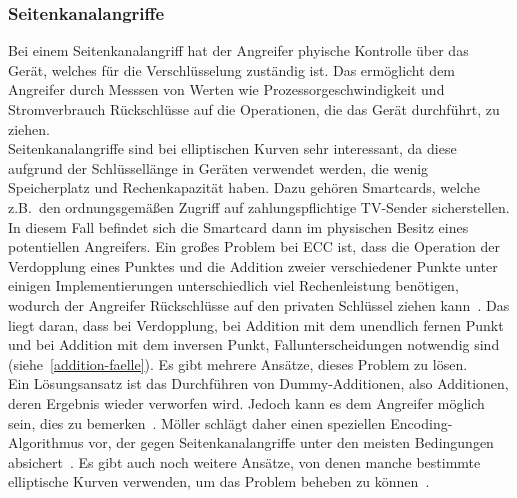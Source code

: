 \documentclass[hidelinks]{article}
\theoremstyle{plain}
\theoremstyle{definition}
\theoremstyle{rem}
\begin{document}
\begin{sloppypar}
\subsubsection{Seitenkanalangriffe}
Bei einem Seitenkanalangriff hat der Angreifer phyische Kontrolle über das Gerät, welches für die Verschlüsselung zuständig ist.
Das ermöglicht dem Angreifer durch Messsen von Werten wie Prozessorgeschwindigkeit und Stromverbrauch Rückschlüsse auf die Operationen, die das Gerät durchführt, zu ziehen.\\
Seitenkanalangriffe sind bei elliptischen Kurven sehr interessant, da diese aufgrund der Schlüssellänge in Geräten verwendet werden, die wenig Speicherplatz und Rechenkapazität haben. Dazu gehören Smartcards, welche z.B.\ den ordnungsgemäßen Zugriff auf zahlungspflichtige TV-Sender sicherstellen. In diesem Fall befindet sich die Smartcard dann im physischen Besitz eines potentiellen Angreifers.
Ein großes Problem bei ECC ist, dass die Operation der Verdopplung eines Punktes und die Addition zweier verschiedener Punkte unter einigen Implementierungen unterschiedlich viel Rechenleistung benötigen, wodurch der Angreifer Rückschlüsse auf den privaten Schlüssel ziehen kann~\cite{moller2001}. 
Das liegt daran, dass bei Verdopplung, bei Addition mit dem unendlich fernen Punkt und bei Addition mit dem inversen Punkt, Fallunterscheidungen notwendig sind (siehe~\ref{addition-faelle}). Es gibt mehrere Ansätze, dieses Problem zu lösen.\\
Ein Lösungsansatz ist das Durchführen von Dummy-Additionen, also Additionen, deren Ergebnis wieder verworfen wird. Jedoch kann es dem Angreifer möglich sein, dies zu bemerken~\cite{moller2001}.
Möller schlägt daher einen speziellen Encoding-Algorithmus vor, der gegen Seitenkanalangriffe unter den meisten Bedingungen absichert~\cite{moller2001}. 
Es gibt auch noch weitere Ansätze, von denen manche bestimmte elliptische Kurven verwenden, um das Problem beheben zu können~\cite{moller2001}.


\end{sloppypar}
\end{document}

